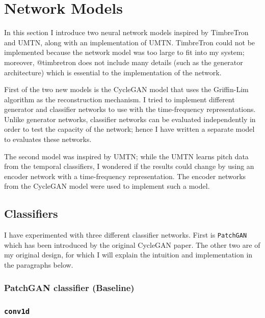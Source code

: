 \documentclass[]{report}
\begin{document}
\hypertarget{network-models}{%
\section{Network Models}\label{network-models}}

In this section I introduce two neural network models inspired by
TimbreTron and UMTN, along with an implementation of UMTN. TimbreTron
could not be implemented because the network model was too large to fit
into my system; moreover, @timbretron does not include many details
(such as the generator architecture) which is essential to the
implementation of the network.

First of the two new models is the CycleGAN model that uses the
Griffin-Lim algorithm as the reconstruction mechanism. I tried to
implement different generator and classifier networks to use with the
time-frequency representations. Unlike generator networks, classifier
networks can be evaluated independently in order to test the capacity of
the network; hence I have written a separate model to evaluates these
networks.

The second model was inspired by UMTN; while the UMTN learns pitch data
from the temporal classifiers, I wondered if the results could change by
using an encoder network with a time-frequency representation. The
encoder networks from the CycleGAN model were used to implement such a
model.

\hypertarget{classifiers}{%
\subsection{Classifiers}\label{classifiers}}

I have experimented with three different classifier networks. First is
\texttt{PatchGAN} which has been introduced by the original CycleGAN
paper. The other two are of my original design, for which I will explain
the intuition and implementation in the paragraphs below.

\hypertarget{patchgan-classifier-baseline}{%
\subsubsection{PatchGAN classifier
(Baseline)}\label{patchgan-classifier-baseline}}

\hypertarget{conv1d}{%
\subsubsection{\texorpdfstring{\texttt{conv1d}}{conv1d}}\label{conv1d}}
\end{document}
